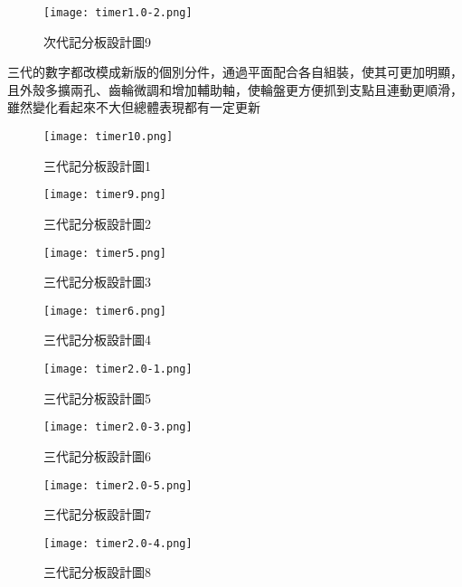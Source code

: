 \begin{figure}
  \centering
  \texttt{[image: timer1.0-2.png]}
  \caption{次代記分板設計圖9}
  \label{fig:example}
\end{figure}



三代的數字都改模成新版的個別分件，通過平面配合各自組裝，使其可更加明顯，且外殼多擴兩孔、齒輪微調和增加輔助軸，使輪盤更方便抓到支點且連動更順滑，雖然變化看起來不大但總體表現都有一定更新


\begin{figure}
  \centering
  \texttt{[image: timer10.png]}
  \caption{三代記分板設計圖1}
  \label{fig:example}
\end{figure}


\begin{figure}
  \centering
  \texttt{[image: timer9.png]}
  \caption{三代記分板設計圖2}
  \label{fig:example}
\end{figure}


\begin{figure}
  \centering
  \texttt{[image: timer5.png]}
  \caption{三代記分板設計圖3}
  \label{fig:example}
\end{figure}


\begin{figure}
  \centering
  \texttt{[image: timer6.png]}
  \caption{三代記分板設計圖4}
  \label{fig:example}
\end{figure}


\begin{figure}
  \centering
  \texttt{[image: timer2.0-1.png]}
  \caption{三代記分板設計圖5}
  \label{fig:example}
\end{figure}


\begin{figure}
  \centering
  \texttt{[image: timer2.0-3.png]}
  \caption{三代記分板設計圖6}
  \label{fig:example}
\end{figure}


\begin{figure}
  \centering
  \texttt{[image: timer2.0-5.png]}
  \caption{三代記分板設計圖7}
  \label{fig:example}
\end{figure}


\begin{figure}
  \centering
  \texttt{[image: timer2.0-4.png]}
  \caption{三代記分板設計圖8}
  \label{fig:example}
\end{figure}


